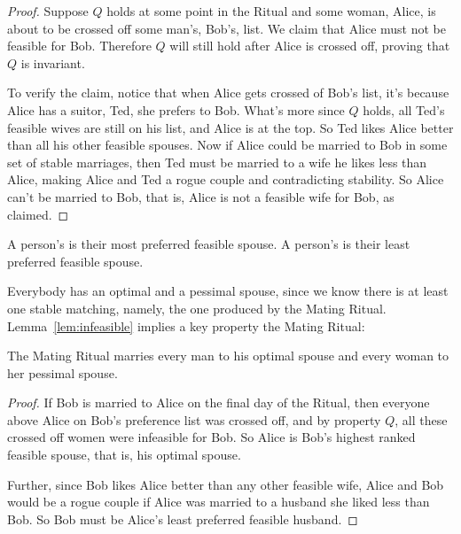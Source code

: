 \begin{proof}
Suppose $Q$ holds at some point in the Ritual and some woman, Alice,
is about to be crossed off some man's, Bob's, list.  We claim that
Alice must not be feasible for Bob.  Therefore $Q$ will still hold
after Alice is crossed off, proving that $Q$ is invariant.

To verify the claim, notice that when Alice gets crossed of Bob's
list, it's because Alice has a suitor, Ted, she prefers to Bob.
What's more since $Q$ holds, all Ted's feasible wives are still on his
list, and Alice is at the top.  So Ted likes Alice better than all his
other feasible spouses.  Now if Alice could be married to Bob in some
set of stable marriages, then Ted must be married to a wife he likes
less than Alice, making Alice and Ted a rogue couple and contradicting
stability.  So Alice can't be married to Bob, that is, Alice is not a
feasible wife for Bob, as claimed.
\end{proof}

\begin{definition}
A person's  is their most preferred feasible
spouse.  A person's  is their least preferred
feasible spouse.
\end{definition}

Everybody has an optimal and a pessimal spouse, since we know there is
at least one stable matching, namely, the one produced by the Mating
Ritual.  Lemma~\ref{lem:infeasible} implies a key property the Mating
Ritual:

\begin{theorem}\label{boyopt}
The Mating Ritual marries every man to his optimal spouse and every
woman to her pessimal spouse.
\end{theorem}

\begin{proof}
If Bob is married to Alice on the final day of the Ritual, then
everyone above Alice on Bob's preference list was crossed off, and by
property $Q$, all these crossed off women were infeasible for Bob.  So
Alice is Bob's highest ranked feasible spouse, that is, his optimal
spouse.

Further, since Bob likes Alice better than any other feasible wife,
Alice and Bob would be a rogue couple if Alice was married to a
husband she liked less than Bob.  So Bob must be Alice's least
preferred feasible husband.
\end{proof}

\iffalse

